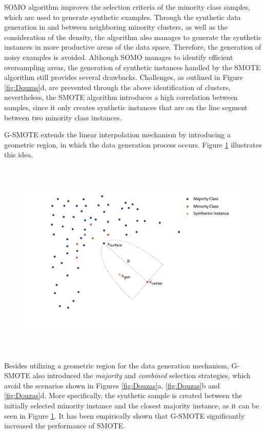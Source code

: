 \documentclass[parskip=full]{scrartcl}
\begin{document}
SOMO algorithm improves the selection criteria of the minority class samples, which are used to generate synthetic examples. Through the synthetic data generation in and between neighboring minority clusters, as well as the consideration of the density, the algorithm also manages to generate the synthetic instances in more productive areas of the data space. Therefore, the generation of noisy examples is avoided. Although SOMO manages to identify efficient oversampling areas, the generation of synthetic instances handled by the SMOTE algorithm still provides several drawbacks. Challenges, as outlined in Figure \ref{fig:Douzas}d, are prevented through the above identification of clusters, nevertheless, the SMOTE algorithm introduces a high correlation between samples, since it only creates synthetic instances that are on the line segment between two minority class instances.

G-SMOTE extends the linear interpolation mechanism by introducing a geometric region, in which the data generation process occurs. Figure \ref{fig:GSMOTE} illustrates this idea.

\begin{figure}[H]
	\centering
	\includegraphics[width=12cm, height=9.5cm, keepaspectratio]{../../analysis/gsomo/fig4.png}
	\label{fig:GSMOTE}
\end{figure}

Besides utilizing a geometric region for the data generation mechanism, G-SMOTE also introduced the \textit{majority} and \textit{combined} selection strategies, which avoid the scenarios shown in Figures \ref{fig:Douzas}a, \ref{fig:Douzas}b and \ref{fig:Douzas}d. More specifically, the synthetic sample is created between the initially selected minority instance and the closest majority instance, as it can be seen in Figure \ref{fig:GSMOTE}. It has been empirically shown that G-SMOTE \cite{Douzas2019} significantly increased the performance of SMOTE.
\end{document}
